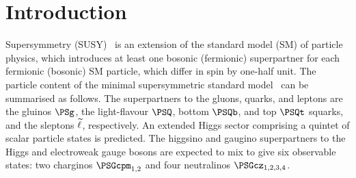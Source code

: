 
\section{Introduction}
\label{sec:introduction}

Supersymmetry (SUSY)~\cite{ref:SUSY-1, ref:SUSY0, ref:SUSY3,
  ref:SUSY1} is an extension of the standard model (SM) of particle
physics, which introduces at least one bosonic (fermionic)
superpartner for each fermionic (bosonic) SM particle, which differ in
spin by one-half unit. The particle content of the minimal
supersymmetric standard model~\cite{ref:SUSY2} can be summarised as
follows. The superpartners to the gluons, quarks, and leptons are the
gluinos $\PSg$, the light-flavour $\PSQ$, bottom $\PSQb$, and top
$\PSQt$ squarks, and the sleptons $\widetilde{\ell}$, respectively. An extended
Higgs sector comprising a quintet of scalar particle states is
predicted. The higgsino and gaugino superpartners to the Higgs and
electroweak gauge bosons are expected to mix to give six observable
states: two charginos $\PSGcpm_{1,2}$ and four neutralinos
$\PSGcz_{1,2,3,4}$. 

